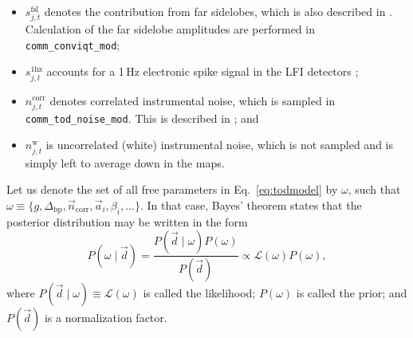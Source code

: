 \documentclass[twocolumn]{aa}
\renewcommand{\d}[0]{\vec{d}}
\newcommand{\n}[0]{\vec{n}}
\renewcommand{\a}[0]{\vec{a}}
\newcommand{\Dbp}[0]{\Delta_{\mathrm{bp}}}
\begin{document}
\begin{itemize}
\item $s^{\mathrm{fsl}}_{j,t}$ denotes the contribution from far sidelobes, which is also described in \citet{BP08}. Calculation of the far sidelobe amplitudes are performed in \texttt{comm\_conviqt\_mod};

\item $s^{\mathrm{1hz}}_{j,t}$ accounts for a 1\,Hz electronic spike
  signal in the LFI detectors \citep{BP01};
  
\item $n^{\mathrm{corr}}_{j,t}$ denotes correlated instrumental noise, which is sampled in \texttt{comm\_tod\_noise\_mod}. This is described in \citet{BP06}; and
  
\item $n^{\mathrm{w}}_{j,t}$ is uncorrelated (white) instrumental noise, which is not sampled and is simply left to average down in the maps.
\end{itemize}

Let us denote the set of all free parameters in Eq.~\eqref{eq:todmodel}
by $\omega$, such that $\omega\equiv\{g,\Dbp,\n_{\mathrm{corr}}, \a_i,
\beta_i,\ldots\}$. In that case, Bayes' theorem states that the
posterior distribution may be written in the form
\begin{equation}
  P(\omega\mid \d) = \frac{P(\d\mid \omega)P(\omega)}{P(\d)} \propto
  \mathcal{L}(\omega)P(\omega),
  \label{eq:jointpost}
\end{equation}
where $P(\d\mid \omega)\equiv\mathcal{L}(\omega)$ is called the
likelihood; $P(\omega)$ is called the prior; and $P(\d)$ is a
normalization factor.
\end{document}
